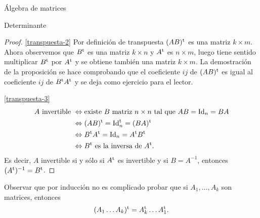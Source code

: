 \begin{chapter}{\'Algebra de matrices}
\begin{section}{Determinante}
\begin{proof}
        \ref{transpuesta-2}    Por definición de transpuesta $(AB)^{\operatorname{t}}$ es una matriz $k \times m$.  Ahora observemos  que $B^{\operatorname{t}}$  es una matriz $k \times n$ y $A^{\operatorname{t}}$ es $n \times m$, luego tiene sentido multiplicar $B^{\operatorname{t}}$ por $A^{\operatorname{t}}$ y se obtiene también  una matriz  $k \times m$. La demostración de la proposición se hace comprobando que el coeficiente $ij$ de $(AB)^{\operatorname{t}}$ es igual al coeficiente $ij$ de $B^{\operatorname{t}} A^{\operatorname{t}}$ y se deja como ejercicio para el lector. 
        
        \ref{transpuesta-3} 
        \begin{align*}
            \text{$A$ invertible } &\Leftrightarrow \text{existe $B$ matriz $n \times n$ tal que $AB = \operatorname{Id}_n = BA$} \\
            &\Leftrightarrow (AB)^{\operatorname{t}} = \operatorname{Id}^{\operatorname{t}}_n = (BA)^{\operatorname{t}}\\
            &\Leftrightarrow B^{\operatorname{t}} A^{\operatorname{t}} = \operatorname{Id}_n = A^{\operatorname{t}} B^{\operatorname{t}}\\
            &\Leftrightarrow \text{$B^{\operatorname{t}}$ es  la inversa de $A^{\operatorname{t}}$}. 
        \end{align*}
        Es decir, $A$ invertible si y sólo si  $A^{\operatorname{t}}$ es invertible y si $B = A^{-1}$, entonces  $(A^{\operatorname{t}})^{-1} = B^{\operatorname{t}}$.
    \end{proof}
    
    Observar que por inducción no es complicado probar que si $A_1,\ldots, A_k$ son matrices,  entonces 
    \begin{equation*}
    (A_1\ldots A_k)^{\operatorname{t}} = A_k^{\operatorname{t}}\ldots A_1^{\operatorname{t}}.
    \end{equation*}
    

\end{section}
\end{chapter}
